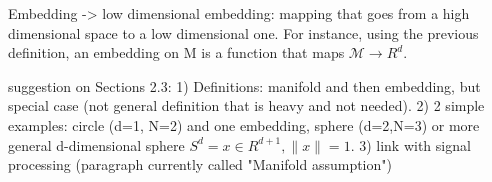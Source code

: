 Embedding -> low dimensional embedding: mapping that goes from a high dimensional space to a low dimensional one. 
For instance, using the previous definition, an embedding on M is a function that maps $\mathcal{M} \to R^d$.


suggestion on Sections 2.3:
1) Definitions: manifold and then embedding, but special case (not general definition that is heavy and not needed).
2) 2 simple examples: circle (d=1, N=2) and one embedding, sphere (d=2,N=3) or more general d-dimensional sphere 
$S^d = {x \in R^{d+1}, \|x\|=1}$. 
3) link with signal processing (paragraph currently called "Manifold assumption")